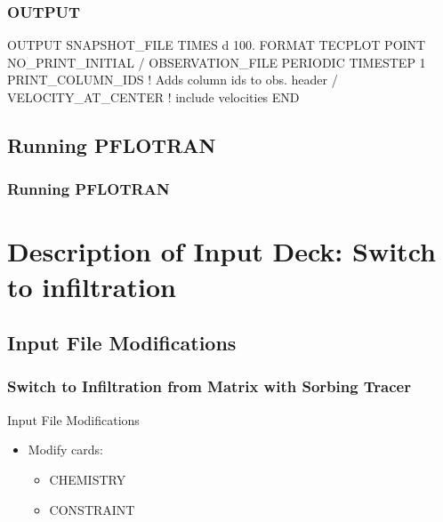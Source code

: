 \documentclass{beamer}
\newcommand\bluecomment[1]{{{\color{blue} #1}}}
\begin{document}
\begin{frame}[fragile]\frametitle{OUTPUT}

\begin{semiverbatim}\small

OUTPUT
  SNAPSHOT_FILE
    TIMES d 100.
    FORMAT TECPLOT POINT
    NO_PRINT_INITIAL
  /
  OBSERVATION_FILE
    PERIODIC TIMESTEP 1
    PRINT_COLUMN_IDS       \bluecomment{! Adds column ids to obs. header}
  /
  VELOCITY_AT_CENTER       \bluecomment{! include velocities}
END

\end{semiverbatim}

\end{frame}



\subsection{Running PFLOTRAN}

\begin{frame}[fragile]\frametitle{Running PFLOTRAN}


\end{frame}

\section{Description of Input Deck: Switch to infiltration}

\subsection{Input File Modifications}

\begin{frame}[fragile]\frametitle{Switch to Infiltration from Matrix with Sorbing Tracer}

Input File Modifications
\begin{itemize}
\item Modify cards:
  \begin{itemize}
    \item CHEMISTRY
    \item CONSTRAINT
   \end{itemize}
\end{itemize}

\end{frame}
\end{document}
